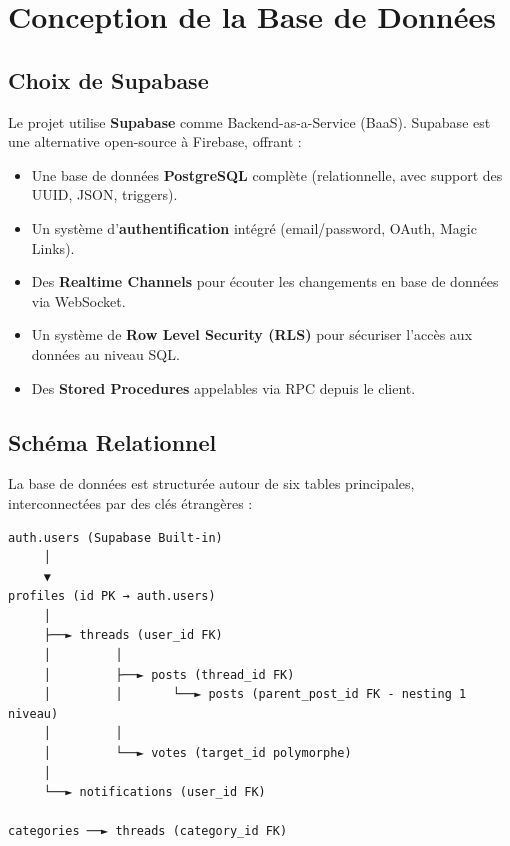 \documentclass[12pt, a4paper]{report}
\begin{document}
\chapter{Conception de la Base de Données}

\section{Choix de Supabase}

Le projet utilise \textbf{Supabase} comme Backend-as-a-Service (BaaS). Supabase est une alternative open-source à Firebase, offrant :

\begin{itemize}
    \item Une base de données \textbf{PostgreSQL} complète (relationnelle, avec support des UUID, JSON, triggers).
    \item Un système d'\textbf{authentification} intégré (email/password, OAuth, Magic Links).
    \item Des \textbf{Realtime Channels} pour écouter les changements en base de données via WebSocket.
    \item Un système de \textbf{Row Level Security (RLS)} pour sécuriser l'accès aux données au niveau SQL.
    \item Des \textbf{Stored Procedures} appelables via RPC depuis le client.
\end{itemize}

\section{Schéma Relationnel}

La base de données est structurée autour de six tables principales, interconnectées par des clés étrangères :

\begin{verbatim}
auth.users (Supabase Built-in)
     │
     ▼
profiles (id PK → auth.users)
     │
     ├──► threads (user_id FK)
     │         │
     │         ├──► posts (thread_id FK)
     │         │       └──► posts (parent_post_id FK - nesting 1 niveau)
     │         │
     │         └──► votes (target_id polymorphe)
     │
     └──► notifications (user_id FK)

categories ──► threads (category_id FK)
\end{verbatim}
\end{document}
